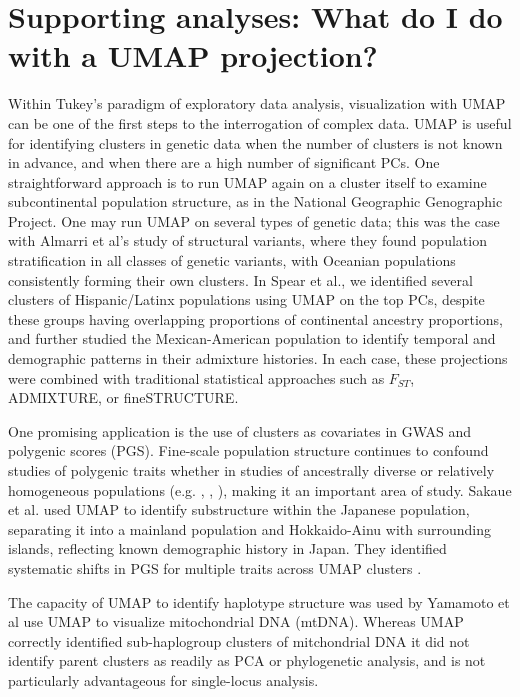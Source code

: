 \documentclass[12pt]{article}
\begin{document}
\section*{Supporting analyses: What do I do with a UMAP projection?}
Within Tukey's paradigm of exploratory data analysis, visualization with UMAP can be one of the first steps to the interrogation of complex data\cite{holmes2018modern}. UMAP is useful for identifying clusters in genetic data when the number of clusters is not known in advance\cite{tonkin-hill_fast_2019}, and when there are a high number of significant PCs\cite{diaz-papkovich_umap_2019}. One straightforward approach is to run UMAP again on a cluster itself to examine subcontinental population structure, as in the National Geographic Genographic Project\cite{dai_population_2020}. One may run UMAP on several types of genetic data; this was the case with Almarri et al's study of structural variants, where they found population stratification in all classes of genetic variants, with Oceanian populations consistently forming their own clusters\cite{almarri2020population}. In Spear et al., we identified several clusters of Hispanic/Latinx populations using UMAP on the top PCs, despite these groups having overlapping proportions of continental ancestry proportions, and further studied the Mexican-American population to identify temporal and demographic patterns in their admixture histories\cite{spear2020recent}. In each case, these projections were combined with traditional statistical approaches such as $F_{ST}$, ADMIXTURE\cite{alexander2009fast}, or fineSTRUCTURE\cite{lawson2012inference}.

One promising application is the use of clusters as covariates in GWAS and polygenic scores (PGS). Fine-scale population structure continues to confound studies of polygenic traits whether in studies of ancestrally diverse or relatively homogeneous populations (e.g. \cite{kerminen2019geographic}, \cite{berg2019reduced}, \cite{sohail2019polygenic}), making it an important area of study. Sakaue et al. used UMAP to identify substructure within the Japanese population, separating it into a mainland population and Hokkaido-Ainu with surrounding islands, reflecting known demographic history in Japan\cite{sakaue_dimensionality_2020}. They identified systematic shifts in PGS for multiple traits across UMAP clusters . 

The capacity of UMAP to identify haplotype structure was used by Yamamoto et al use UMAP to visualize mitochondrial DNA (mtDNA). Whereas UMAP correctly identified sub-haplogroup clusters of mitchondrial DNA it did not identify parent clusters as readily as PCA or phylogenetic analysis, and is not particularly advantageous for single-locus analysis\cite{yamamoto_genetic_2020}.
\end{document}
